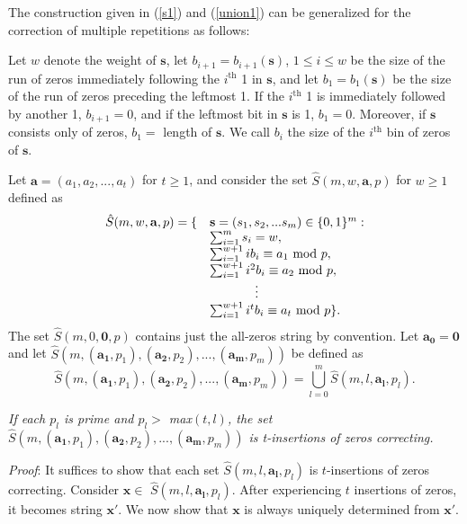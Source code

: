 The construction given in (\ref{s1}) and (\ref{union1}) can be
generalized for the correction of multiple repetitions as follows:

Let $w$ denote the weight of $\mathbf{s}$, let
$b_{i+1}=b_{i+1}(\mathbf{s})$, $1 \leq i \leq w$ be the size of
the run of zeros immediately following the $i^{\text{th}}$ 1 in
$\mathbf{s}$, and let $b_1=b_1(\mathbf{s})$ be the size of the run
of zeros preceding the leftmost 1. If the $i^{\text{th}}$ 1 is
immediately followed by another 1, $b_{i+1}=0$, and if the
leftmost bit in $\mathbf{s}$ is 1, $b_1=0$. Moreover, if
$\mathbf{s}$ consists only of zeros, $b_1=$ length of
$\mathbf{s}$. We call $b_i$ the size of the $i^{\text{th}}$ bin of
zeros of $\mathbf{s}$.

Let $\mathbf{a}=\left(a_1,a_2,...,a_t\right)$ for $t \geq 1$, and
consider the set $\hat{S}(m,w,\mathbf{a},p)$ for $w \geq 1$
defined as
\begin{equation}\begin{array}{lll}\hat{S}(m,w,\mathbf{a},p) = \{ & \mathbf{s}=(s_1, s_2, ... s_m) \in \{0,1\}^m
:\\ {} & \sum_{i=1}^m s_i = w,\\
{} & \sum_{i=1}^{w+1} ib_i \equiv a_1 \text{ mod } p,\\ {} &
\sum_{i=1}^{w+1} i^2b_i
\equiv a_2 \text{ mod } p,\\
{} & \hspace{0.5in}\vdots\\ {} & \sum_{i=1}^{w+1} i^tb_i \equiv
a_t \text{ mod } p\}.\end{array}\end{equation} The set
$\hat{S}(m,0,\mathbf{0},p)$ contains just the all-zeros string by
convention. Let $\mathbf{a_0} = \mathbf{0}$ and let
$\hat{S}\left(m,(\mathbf{a_1},p_1),(\mathbf{a_2},p_2),...,(\mathbf{a_m},p_m)\right)$
be defined as \vspace{-0.1in}
\begin{equation}\label{union}\hat{S}\left(m,(\mathbf{a_1},p_1),(\mathbf{a_2},p_2),...,(\mathbf{a_m},p_m)\right)=
\bigcup_{l=0}^{m} \hat{S}(m,l,\mathbf{a_l},p_l).\end{equation}
\begin{lemma}\textit{If each $p_l$ is prime and $p_l >$
max$(t,l)$, the set
$\hat{S}\left(m,(\mathbf{a_1},p_1),(\mathbf{a_2},p_2),...,(\mathbf{a_m},p_m)\right)$
is t-insertions of zeros correcting.}\end{lemma}

\textit{Proof}: It suffices to show that each set
$\hat{S}(m,l,\mathbf{a_l},p_l)$ is $t$-insertions of zeros
correcting. Consider $\mathbf{x} \in$
$\hat{S}(m,l,\mathbf{a_l},p_l)$. After experiencing $t$ insertions
of zeros, it becomes string $\mathbf{x'}$. We now show that
$\mathbf{x}$ is always uniquely determined from $\mathbf{x'}$.


